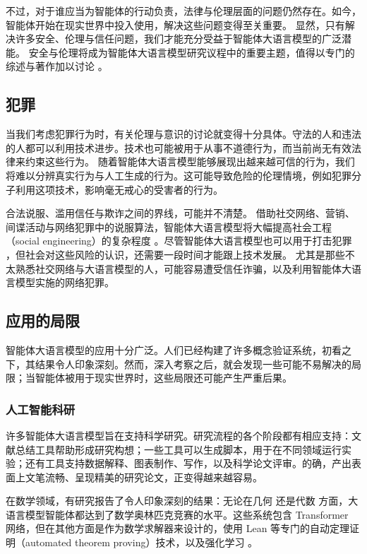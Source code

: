 不过，对于谁应当为智能体的行动负责，法律与伦理层面的问题仍然存在。如今，智能体开始在现实世界中投入使用，解决这些问题变得至关重要。
显然，只有解决许多安全、伦理与信任问题，我们才能充分受益于智能体大语言模型的广泛潜能。
安全与伦理将成为智能体大语言模型研究议程中的重要主题，值得以专门的综述与著作加以讨论 \citep{gan2024navigating,jiao2025navigating,raza2025responsible}。




\subsection{犯罪}
当我们考虑犯罪行为时，有关伦理与意识的讨论就变得十分具体。守法的人和违法的人都可以利用技术进步。技术也可能被用于从事不道德行为，而当前尚无有效法律来约束这些行为。
随着智能体大语言模型能够展现出越来越可信的行为，我们将难以分辨真实行为与人工生成的行为。这可能导致危险的伦理情境，例如犯罪分子利用这项技术，影响毫无戒心的受害者的行为。

合法说服、滥用信任与欺诈之间的界线，可能并不清楚。
借助社交网络、营销、间谍活动与网络犯罪中的说服算法，智能体大语言模型将大幅提高社会工程（social engineering）的复杂程度 \citep{kshetri2025transforming,lupinacci2025dark}。尽管智能体大语言模型也可以用于打击犯罪 \citep{challita2025redteamllm,andriushchenko2024agentharm}，但社会对这些风险的认识，还需要一段时间才能跟上技术发展。
尤其是那些不太熟悉社交网络与大语言模型的人，可能容易遭受信任诈骗，以及利用智能体大语言模型实施的网络犯罪。


\subsection{应用的局限}
智能体大语言模型的应用十分广泛。人们已经构建了许多概念验证系统，初看之下，其结果令人印象深刻。然而，深入考察之后，就会发现一些可能不易解决的局限；当智能体被用于现实世界时，这些局限还可能产生严重后果。

\subsubsection{人工智能科研}
许多智能体大语言模型旨在支持科学研究。研究流程的各个阶段都有相应支持：文献总结工具帮助形成研究构想；一些工具可以生成脚本，用于在不同领域运行实验；还有工具支持数据解释、图表制作、写作，以及科学论文评审。的确，产出表面上文笔流畅、呈现精美的研究论文，正变得越来越容易。

在数学领域，有研究报告了令人印象深刻的结果：无论在几何 \citep{trinh2024solving} 还是代数 \citep{hubert2025olympiad} 方面，大语言模型智能体都达到了数学奥林匹克竞赛的水平。这些系统包含 Transformer 网络，但在其他方面是作为数学求解器来设计的，使用 Lean \citep{de2015lean} 等专门的自动定理证明（automated theorem proving）技术，以及强化学习 \citep{silver2017mastering,browne2012survey}。

